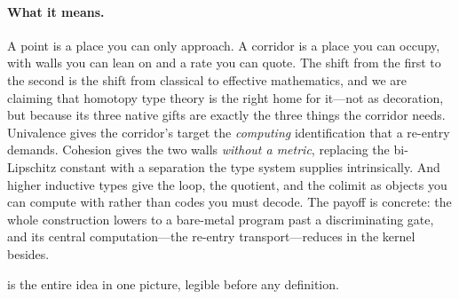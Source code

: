 \documentclass[11pt,letterpaper]{article}
\theoremstyle{plain}
\theoremstyle{definition}
\theoremstyle{remark}
\begin{document}
\paragraph{What it means.}
A point is a place you can only approach. A corridor is a place you can occupy,
with walls you can lean on and a rate you can quote. The shift from the first to
the second is the shift from classical to effective mathematics, and we are
claiming that homotopy type theory is the right home for it---not as decoration,
but because its three native gifts are exactly the three things the corridor
needs. Univalence gives the corridor's target the \emph{computing} identification
that a re-entry demands. Cohesion gives the two walls \emph{without a metric},
replacing the bi-Lipschitz constant with a separation the type system supplies
intrinsically. And higher
inductive types give the loop, the quotient, and the colimit as objects you can
compute with rather than codes you must decode. The payoff is concrete: the whole
construction lowers to a bare-metal program past a discriminating gate, and its
central computation---the re-entry transport---reduces in the kernel besides.

 is the entire idea in one picture, legible before any
definition.
\end{document}
